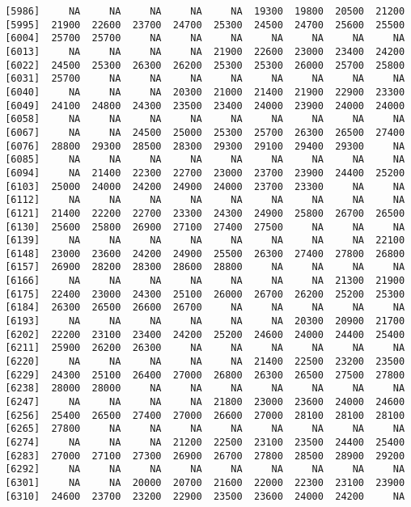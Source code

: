 \documentclass[]{article}
\begin{document}
\begin{verbatim}
 [5986]     NA     NA     NA     NA     NA  19300  19800  20500  21200
 [5995]  21900  22600  23700  24700  25300  24500  24700  25600  25500
 [6004]  25700  25700     NA     NA     NA     NA     NA     NA     NA
 [6013]     NA     NA     NA     NA  21900  22600  23000  23400  24200
 [6022]  24500  25300  26300  26200  25300  25300  26000  25700  25800
 [6031]  25700     NA     NA     NA     NA     NA     NA     NA     NA
 [6040]     NA     NA     NA  20300  21000  21400  21900  22900  23300
 [6049]  24100  24800  24300  23500  23400  24000  23900  24000  24000
 [6058]     NA     NA     NA     NA     NA     NA     NA     NA     NA
 [6067]     NA     NA  24500  25000  25300  25700  26300  26500  27400
 [6076]  28800  29300  28500  28300  29300  29100  29400  29300     NA
 [6085]     NA     NA     NA     NA     NA     NA     NA     NA     NA
 [6094]     NA  21400  22300  22700  23000  23700  23900  24400  25200
 [6103]  25000  24000  24200  24900  24000  23700  23300     NA     NA
 [6112]     NA     NA     NA     NA     NA     NA     NA     NA     NA
 [6121]  21400  22200  22700  23300  24300  24900  25800  26700  26500
 [6130]  25600  25800  26900  27100  27400  27500     NA     NA     NA
 [6139]     NA     NA     NA     NA     NA     NA     NA     NA  22100
 [6148]  23000  23600  24200  24900  25500  26300  27400  27800  26800
 [6157]  26900  28200  28300  28600  28800     NA     NA     NA     NA
 [6166]     NA     NA     NA     NA     NA     NA     NA  21300  21900
 [6175]  22400  23000  24300  25100  26000  26700  26200  25200  25300
 [6184]  26300  26500  26600  26700     NA     NA     NA     NA     NA
 [6193]     NA     NA     NA     NA     NA     NA  20300  20900  21700
 [6202]  22200  23100  23400  24200  25200  24600  24000  24400  25400
 [6211]  25900  26200  26300     NA     NA     NA     NA     NA     NA
 [6220]     NA     NA     NA     NA     NA  21400  22500  23200  23500
 [6229]  24300  25100  26400  27000  26800  26300  26500  27500  27800
 [6238]  28000  28000     NA     NA     NA     NA     NA     NA     NA
 [6247]     NA     NA     NA     NA  21800  23000  23600  24000  24600
 [6256]  25400  26500  27400  27000  26600  27000  28100  28100  28100
 [6265]  27800     NA     NA     NA     NA     NA     NA     NA     NA
 [6274]     NA     NA     NA  21200  22500  23100  23500  24400  25400
 [6283]  27000  27100  27300  26900  26700  27800  28500  28900  29200
 [6292]     NA     NA     NA     NA     NA     NA     NA     NA     NA
 [6301]     NA     NA  20000  20700  21600  22000  22300  23100  23900
 [6310]  24600  23700  23200  22900  23500  23600  24000  24200     NA

\end{verbatim}
\end{document}
